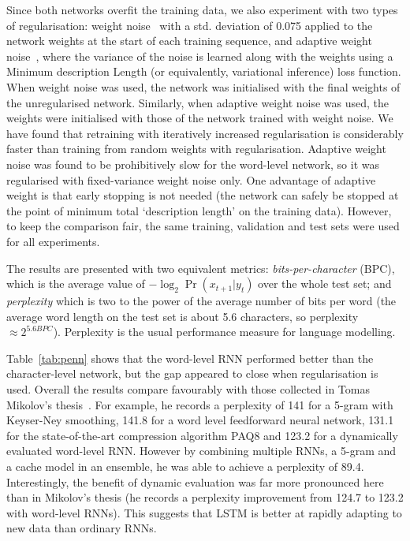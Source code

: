Since both networks overfit the training data, we also experiment with two types of regularisation: weight noise~\cite{chuen96noise} with a std. deviation of 0.075 applied to the network weights at the start of each training sequence, and adaptive weight noise~\cite{graves11nips}, where the variance of the noise is learned along with the weights using a Minimum description Length (or equivalently, variational inference) loss function. When weight noise was used, the network was initialised with the final weights of the unregularised network. Similarly, when adaptive weight noise was used, the weights were initialised with those of the network trained with weight noise. We have found that retraining with iteratively increased regularisation is considerably faster than  training from random weights with regularisation. Adaptive weight noise was found to be prohibitively slow for the word-level network, so it was regularised with fixed-variance weight noise only. One advantage of adaptive weight is that early stopping is not needed (the network can safely be stopped at the point of minimum total `description length' on the training data). However, to keep the comparison fair, the same training, validation and test sets were used for all experiments.

The results are presented with two equivalent metrics: \emph{bits-per-character} (BPC), which is the average value of  $-\log_2 \Pr(x_{t+1}|y_t)$ over the whole test set; and \emph{perplexity} which is two to the power of the average number of bits per word (the average word length on the test set is about 5.6 characters, so perplexity $\approx 2^{5.6 BPC}$). Perplexity is the usual performance measure for language modelling.

Table~\ref{tab:penn} shows that the word-level RNN performed better than the character-level network, but the gap appeared to close when regularisation is used. Overall the results compare favourably with those collected in Tomas Mikolov's thesis~\cite{mikolov12thesis}. For example, he records a perplexity of 141 for a 5-gram with Keyser-Ney smoothing, 141.8 for a word level feedforward neural network, 131.1 for the state-of-the-art compression algorithm PAQ8 and 123.2 for a dynamically evaluated word-level RNN. However by combining multiple RNNs, a 5-gram and a cache model in an ensemble, he was able to achieve a  perplexity of 89.4. Interestingly, the benefit of dynamic evaluation was far more pronounced here than in Mikolov's thesis (he records a perplexity improvement from 124.7 to 123.2 with word-level RNNs). This suggests that LSTM is better at rapidly adapting to new data than ordinary RNNs.

